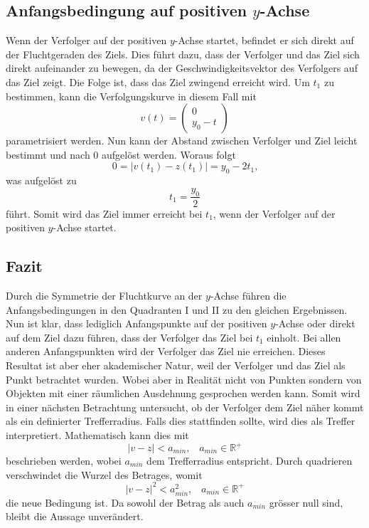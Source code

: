 \subsection{Anfangsbedingung auf positiven $y$-Achse}
Wenn der Verfolger auf der positiven $y$-Achse startet, befindet er sich direkt auf der Fluchtgeraden des Ziels.
Dies führt dazu, dass der Verfolger und das Ziel sich direkt aufeinander zu bewegen, da der Geschwindigkeitsvektor des Verfolgers auf das Ziel zeigt.
Die Folge ist, dass das Ziel zwingend erreicht wird.
Um $t_1$ zu bestimmen, kann die Verfolgungskurve in diesem Fall mit
%
\begin{equation}
    v(t)
    =
    \left( \begin{array}{c} 0 \\ y_0-t \end{array} \right)
\end{equation}
%
parametrisiert werden.
Nun kann der Abstand zwischen Verfolger und Ziel leicht bestimmt und nach 0 aufgelöst werden.
Woraus folgt
%
\begin{equation}
    0
    =
    |v(t_1)-z(t_1)|
    =
    y_0-2t_1\text{,}
\end{equation}
%
was aufgelöst zu
%
\begin{equation}
    t_1
    =
    \frac{y_0}{2}
\end{equation}
%
führt.
Somit wird das Ziel immer erreicht bei $t_1$, wenn der Verfolger auf der positiven $y$-Achse startet.
\subsection{Fazit}
Durch die Symmetrie der Fluchtkurve an der $y$-Achse führen die Anfangsbedingungen in den Quadranten \RN{1} und \RN{2} zu den gleichen Ergebnissen. Nun ist klar, dass lediglich Anfangspunkte auf der positiven $y$-Achse oder direkt auf dem Ziel dazu führen, dass der Verfolger das Ziel bei $t_1$ einholt.
Bei allen anderen Anfangspunkten wird der Verfolger das Ziel nie erreichen.
Dieses Resultat ist aber eher akademischer Natur, weil der Verfolger und das Ziel als Punkt betrachtet wurden.
Wobei aber in Realität nicht von Punkten sondern von Objekten mit einer räumlichen Ausdehnung gesprochen werden kann.
Somit wird in einer nächsten Betrachtung untersucht, ob der Verfolger dem Ziel näher kommt als ein definierter Trefferradius.
Falls dies stattfinden sollte, wird dies als Treffer interpretiert.
Mathematisch kann dies mit
%
\begin{equation}
    |v-z|<a_{min} \text{,}\quad a_{min}\in\mathbb{R}^+
\end{equation}
%
beschrieben werden, wobei $a_{min}$ dem Trefferradius entspricht.
Durch quadrieren verschwindet die Wurzel des Betrages, womit
%
\begin{equation}
    |v-z|^2<a_{min}^2 \text{,}\quad a_{min}\in \mathbb{R}^+
\end{equation}
%
die neue Bedingung ist.
Da sowohl der Betrag als auch $a_{min}$ grösser null sind, bleibt die Aussage unverändert.
%
